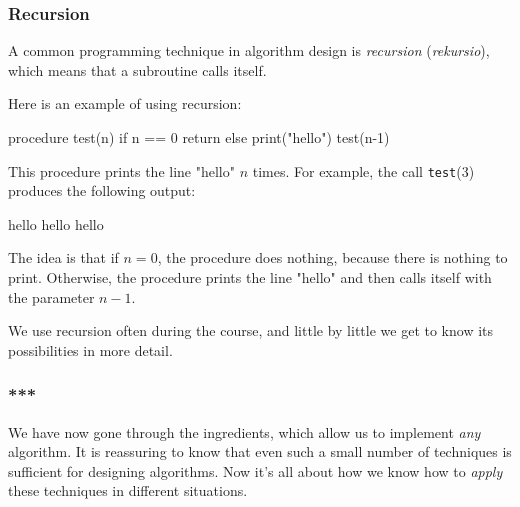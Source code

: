 \subsubsection{Recursion}


A common programming technique in algorithm design is
\emph{recursion} (\emph{rekursio}),
which means that a subroutine calls itself.

Here is an example of using recursion:

\begin{code}
    procedure test(n)
    if n == 0
    return
    else
    print("hello")
    test(n-1)
\end{code}


This procedure prints the line "hello" $n$ times.
For example, the call \texttt{test}(3) produces the following output:

\begin{code}
    hello
    hello
    hello
\end{code}

The idea is that if $n=0$, the procedure does nothing,
because there is nothing to print.
Otherwise, the procedure prints the line "hello"
and then calls itself with the parameter $n-1$.

We use recursion often during the course,
and little by little we get to know its possibilities in more detail.

\subsubsection{***}

We have now gone through the ingredients,
which allow us to implement \emph{any} algorithm.
It is reassuring to know that even such a small number of techniques
is sufficient for designing algorithms.
Now it's all about how we know how to \emph{apply}
these techniques in different situations.
